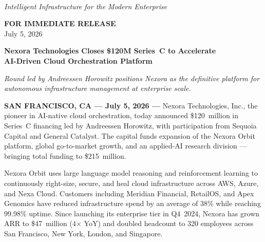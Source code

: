 \documentclass[10pt,a4paper]{article}
\newcommand{\hrulethick}{{\color{accent}\rule{\linewidth}{2pt}}}
\newcommand{\hrulethin}{{\color{ruled}\rule{\linewidth}{0.5pt}}}
\begin{document}
\thispagestyle{empty}

\begin{minipage}[c]{0.48\linewidth}
  \\[1pt]
  {\color{muted}\fontsize{7.5}{9}\selectfont\itshape
    Intelligent Infrastructure for the Modern Enterprise}
\end{minipage}%
\hfill
\begin{minipage}[c]{0.46\linewidth}
  \raggedleft
  {\color{accent}\bfseries FOR IMMEDIATE RELEASE}\\[1pt]
  {\color{muted}\small July 5, 2026}
\end{minipage}

\vspace{3pt}\hrulethick\vspace{7pt}

{%
  {\fontsize{17}{21}\selectfont\bfseries\color{accentdark}%
    Nexora Technologies Closes \$120M Series~C to Accelerate\\
    AI-Driven Cloud Orchestration Platform}\par}
\vspace{3pt}
{\color{muted}\fontsize{10.5}{13}\selectfont\itshape
  Round led by Andreessen Horowitz positions Nexora as the definitive platform
  for autonomous infrastructure management at enterprise scale.}\par
\vspace{5pt}\hrulethin\vspace{6pt}

{\bfseries SAN FRANCISCO, CA — July 5, 2026 —}
Nexora Technologies, Inc., the pioneer in AI-native cloud orchestration,
today announced \$120~million in Series~C financing led by Andreessen
Horowitz, with participation from Sequoia Capital and General Catalyst.
The capital funds expansion of the Nexora Orbit platform, global
go-to-market growth, and an applied-AI research division — bringing total
funding to \$215~million.

Nexora Orbit uses large language model reasoning and reinforcement learning
to continuously right-size, secure, and heal cloud infrastructure across
AWS, Azure, and Nexa Cloud. Customers including Meridian Financial,
RetailOS, and Apex Genomics have reduced infrastructure spend by an average
of 38\% while reaching 99.98\% uptime. Since launching its enterprise tier
in Q4~2024, Nexora has grown ARR to \$47~million (4$\times$ YoY) and
doubled headcount to 320 employees across San Francisco, New York, London,
and Singapore.
\end{document}
